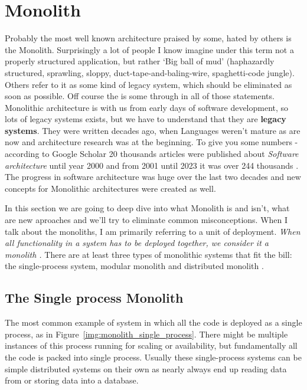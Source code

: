 
\section{Monolith}
Probably the most well known architecture praised by some, hated by others is the Monolith. Surprisingly a lot of people I know imagine under this term not a properly structured application, but rather `Big ball of mud' \cite{BIG_BALL_OF_MUD} (haphazardly structured, sprawling, sloppy, duct-tape-and-baling-wire, spaghetti-code jungle). Others refer to it as some kind of legacy system, which should be eliminated as soon as possible. Off course the is some through in all of those statements. Monolithic architecture is with us from early days of software development, so lots of legacy systems exists, but we have to understand that they are \textbf{legacy systems}. They were written decades ago, when Languages weren't mature as are now and architecture research was at the beginning. To give you some numbers - according to Google Scholar 20 thousands articles were published about \textit{Software architecture} until year 2000 \cite{SCHOLAR_2000} and from 2001 until 2023 it was over 244 thousands \cite{SCHOLAR_2001_2023}. The progress in software architecture was huge over the last two decades and new concepts for Monolithic architectures were created as well.

In this section we are going to deep dive into what Monolith is and isn't, what are new aproaches and we'll try to eliminate common misconceptions. When I talk about the monoliths, I am primarily referring to a unit of deployment\cite{MON_TO_MS_MONOLITH}. \textit{When all functionality in a system has to be deployed together, we consider it a monolith \cite{MON_TO_MS_MONOLITH}.} There are at least three types of monolithic systems that fit the bill: the single-process system, modular monolith and distributed monolith \cite{BUILDING_MS_MONOLITH}.


\subsection{The Single process Monolith}
The most common example of system in which all the code is deployed as a single process, as in Figure~\ref{img:monolith_single_process}. There might be multiple instances of this process running for scaling or availability, but fundamentally all the code is packed into single process. Usually these single-process systems can be simple distributed systems on their own as nearly always end up reading data from or storing data into a database. \cite{MON_TO_MS_MONOLITH}


